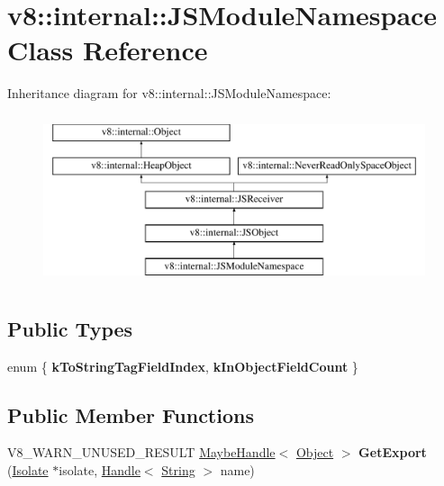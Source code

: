 \hypertarget{classv8_1_1internal_1_1JSModuleNamespace}{}\section{v8\+:\+:internal\+:\+:J\+S\+Module\+Namespace Class Reference}
\label{classv8_1_1internal_1_1JSModuleNamespace}
Inheritance diagram for v8\+:\+:internal\+:\+:J\+S\+Module\+Namespace\+:\begin{figure}[H]
\begin{center}
\leavevmode
\includegraphics[height=5.000000cm]{classv8_1_1internal_1_1JSModuleNamespace}
\end{center}
\end{figure}
\subsection*{Public Types}
\begin{DoxyCompactItemize}
\item 
\mbox{\label{classv8_1_1internal_1_1JSModuleNamespace_ae02ae97ebcabdc2bdcec8a6637dcea69}} 
enum \{ {\bfseries k\+To\+String\+Tag\+Field\+Index}, 
{\bfseries k\+In\+Object\+Field\+Count}
 \}
\end{DoxyCompactItemize}
\subsection*{Public Member Functions}
\begin{DoxyCompactItemize}
\item 
\mbox{\label{classv8_1_1internal_1_1JSModuleNamespace_ab58d5155628a4883a08ddedcf1d134a6}} 
V8\+\_\+\+W\+A\+R\+N\+\_\+\+U\+N\+U\+S\+E\+D\+\_\+\+R\+E\+S\+U\+LT \mbox{\hyperlink{classv8_1_1internal_1_1MaybeHandle}{Maybe\+Handle}}$<$ \mbox{\hyperlink{classv8_1_1internal_1_1Object}{Object}} $>$ {\bfseries Get\+Export} (\mbox{\hyperlink{classv8_1_1internal_1_1Isolate}{Isolate}} $\ast$isolate, \mbox{\hyperlink{classv8_1_1internal_1_1Handle}{Handle}}$<$ \mbox{\hyperlink{classv8_1_1internal_1_1String}{String}} $>$ name)
\end{DoxyCompactItemize}
